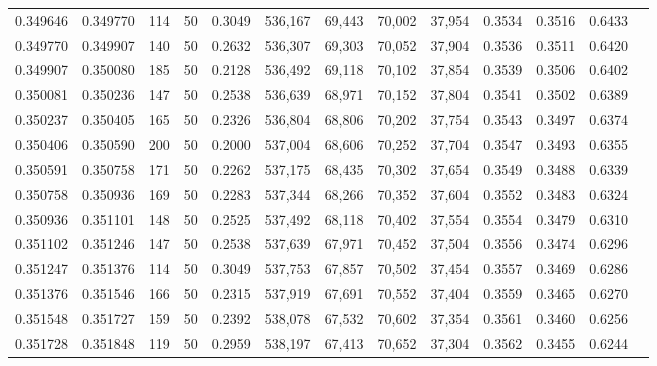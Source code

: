 \begin{tabular}{rrrrrrrrrrrrr}
0.349646 & 0.349770 &   114 &  50 &                                     0.3049 & 536,167 &  69,443 &  70,002 &  37,954 & 0.3534 & 0.3516 & 0.6433 \\
0.349770 & 0.349907 &   140 &  50 &                                     0.2632 & 536,307 &  69,303 &  70,052 &  37,904 & 0.3536 & 0.3511 & 0.6420 \\
0.349907 & 0.350080 &   185 &  50 &                                     0.2128 & 536,492 &  69,118 &  70,102 &  37,854 & 0.3539 & 0.3506 & 0.6402 \\
0.350081 & 0.350236 &   147 &  50 &                                     0.2538 & 536,639 &  68,971 &  70,152 &  37,804 & 0.3541 & 0.3502 & 0.6389 \\
0.350237 & 0.350405 &   165 &  50 &                                     0.2326 & 536,804 &  68,806 &  70,202 &  37,754 & 0.3543 & 0.3497 & 0.6374 \\
0.350406 & 0.350590 &   200 &  50 &                                     0.2000 & 537,004 &  68,606 &  70,252 &  37,704 & 0.3547 & 0.3493 & 0.6355 \\
0.350591 & 0.350758 &   171 &  50 &                                     0.2262 & 537,175 &  68,435 &  70,302 &  37,654 & 0.3549 & 0.3488 & 0.6339 \\
0.350758 & 0.350936 &   169 &  50 &                                     0.2283 & 537,344 &  68,266 &  70,352 &  37,604 & 0.3552 & 0.3483 & 0.6324 \\
0.350936 & 0.351101 &   148 &  50 &                                     0.2525 & 537,492 &  68,118 &  70,402 &  37,554 & 0.3554 & 0.3479 & 0.6310 \\
0.351102 & 0.351246 &   147 &  50 &                                     0.2538 & 537,639 &  67,971 &  70,452 &  37,504 & 0.3556 & 0.3474 & 0.6296 \\
0.351247 & 0.351376 &   114 &  50 &                                     0.3049 & 537,753 &  67,857 &  70,502 &  37,454 & 0.3557 & 0.3469 & 0.6286 \\
0.351376 & 0.351546 &   166 &  50 &                                     0.2315 & 537,919 &  67,691 &  70,552 &  37,404 & 0.3559 & 0.3465 & 0.6270 \\
0.351548 & 0.351727 &   159 &  50 &                                     0.2392 & 538,078 &  67,532 &  70,602 &  37,354 & 0.3561 & 0.3460 & 0.6256 \\
0.351728 & 0.351848 &   119 &  50 &                                     0.2959 & 538,197 &  67,413 &  70,652 &  37,304 & 0.3562 & 0.3455 & 0.6244 \\

\end{tabular}
